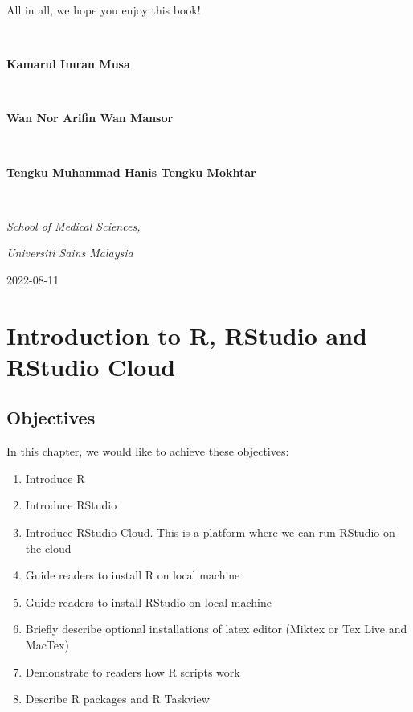 \documentclass[
  10pt,
]{krantz}
\providecommand{\tightlist}{%
  \setlength{\itemsep}{0pt}\setlength{\parskip}{0pt}}
\begin{document}
All in all, we hope you enjoy this book!

~

\textbf{Kamarul Imran Musa}

~

\textbf{Wan Nor Arifin Wan Mansor}

~

\textbf{Tengku Muhammad Hanis Tengku Mokhtar}

~

\emph{School of Medical Sciences,}

\emph{Universiti Sains Malaysia}

2022-08-11

\mainmatter

\hypertarget{introduction-to-r-rstudio-and-rstudio-cloud}{%
\chapter{\texorpdfstring{Introduction to R, RStudio and RStudio Cloud}{Introduction to R, RStudio and RStudio Cloud}}\label{introduction-to-r-rstudio-and-rstudio-cloud}}

\hypertarget{objectives}{%
\section{Objectives}\label{objectives}}

In this chapter, we would like to achieve these objectives:

\begin{enumerate}
\def\labelenumi{\arabic{enumi}.}
\tightlist
\item
  Introduce R
\item
  Introduce RStudio
\item
  Introduce RStudio Cloud. This is a platform where we can run RStudio on the cloud
\item
  Guide readers to install R on local machine
\item
  Guide readers to install RStudio on local machine
\item
  Briefly describe optional installations of latex editor (Miktex or Tex Live and MacTex)
\item
  Demonstrate to readers how R scripts work
\item
  Describe R packages and R Taskview
\end{enumerate}
\end{document}
